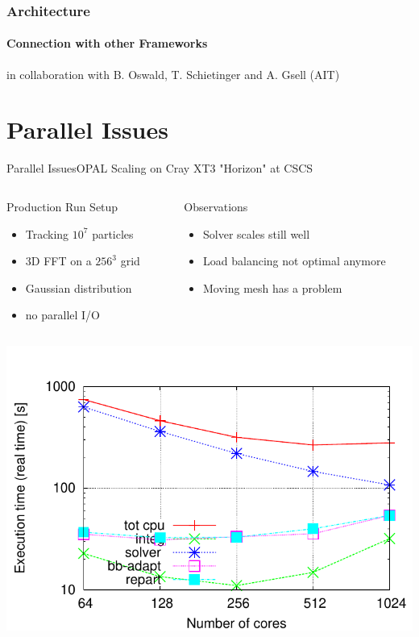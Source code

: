 \documentclass[xcolor=pdftex,table,10pt,yellow,mathserif]{beamer}
\newcommand{\opal}{\textsc{OPAL }}
\begin{document}
 
 \begin{frame}
\frametitle{Architecture}
\framesubtitle{Connection with other Frameworks}
\vspace{-1cm}
\begin{center}

\end{center}
\small{in collaboration with B. Oswald, T. Schietinger and A. Gsell (AIT)}
\end{frame}
 
 \section{Parallel Issues}
\begin{frame}{Parallel Issues}{\opal Scaling on Cray XT3  "Horizon" at CSCS}
  \begin{columns}
    \begin{column}{4.5cm}
      \scriptsize
      \begin{block}{Production Run Setup}
        \begin{itemize}
        \item Tracking $10^7$ particles 
        \item 3D FFT on a $256^3$ grid
        \item Gaussian distribution
        \item no parallel I/O
        \end{itemize}
      \end{block}
      \end{column}
      \begin{column}{6.5cm}
      \begin{block}{Observations}
        \begin{itemize}
        \item Solver scales still well
        \item Load balancing not optimal anymore 
        \item Moving mesh has a problem 
        \end{itemize}
     \end{block}
    \end{column}
  \end{columns}
  \vspace{-.8cm}
      \begin{center}
      \includegraphics[scale=0.45]{figures/timing-mult-1-PPP-large}    %

\end{center}
\end{frame}
\end{document}
